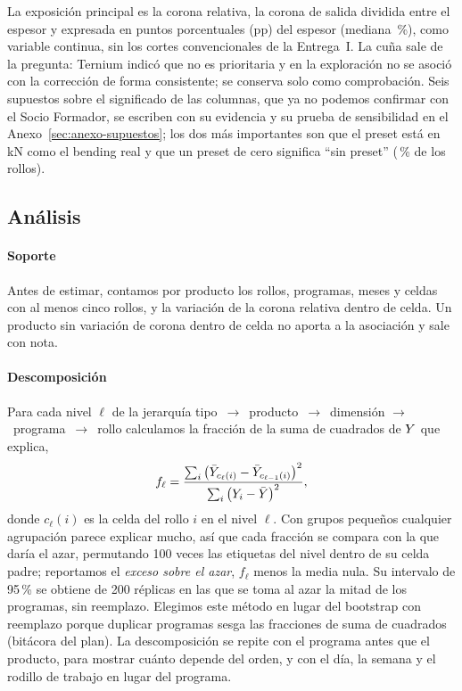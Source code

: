 La exposición principal es la corona relativa, la corona de salida dividida entre el espesor y expresada en puntos
porcentuales (pp) del espesor (mediana \CoronaRelMediana\,\%), como variable continua, sin los cortes convencionales
de la Entrega~I. La cuña sale de la pregunta: Ternium indicó que no es prioritaria y en la exploración no se asoció
con la corrección de forma consistente; se conserva solo como comprobación. Seis supuestos sobre el significado de las
columnas, que ya no podemos confirmar con el Socio Formador, se escriben con su evidencia y su prueba de sensibilidad
en el Anexo~\ref{sec:anexo-supuestos}; los dos más importantes son que el preset está en kN como el bending real y que
un preset de cero significa ``sin preset'' (\PctPresetCero\,\% de los rollos).

\subsection{Análisis}
\label{sec:analisis}

\paragraph{Soporte} Antes de estimar, contamos por producto los rollos, programas, meses y celdas con al menos cinco
rollos, y la variación de la corona relativa dentro de celda. Un producto sin variación de corona dentro de celda no
aporta a la asociación y sale con nota.

\paragraph{Descomposición} Para cada nivel $\ell$ de la jerarquía tipo~$\rightarrow$~producto~$\rightarrow$~dimensión
$\rightarrow$~programa~$\rightarrow$~rollo calculamos la fracción de la suma de cuadrados de $Y$ que explica,
\begin{equation}
f_\ell = \frac{\sum_i \left(\bar{Y}_{c_\ell(i)} - \bar{Y}_{c_{\ell-1}(i)}\right)^2}{\sum_i \left(Y_i - \bar{Y}\right)^2},
\label{eq:descomp}
\end{equation}
donde $c_\ell(i)$ es la celda del rollo $i$ en el nivel $\ell$. Con grupos pequeños cualquier agrupación parece explicar
mucho, así que cada fracción se compara con la que daría el azar, permutando 100 veces las etiquetas del nivel dentro de
su celda padre; reportamos el \emph{exceso sobre el azar}, $f_\ell$ menos la media nula. Su intervalo de 95\,\% se
obtiene de 200 réplicas en las que se toma al azar la mitad de los programas, sin reemplazo. Elegimos este método en
lugar del bootstrap con reemplazo porque duplicar programas sesga las fracciones de suma de cuadrados (bitácora del
plan). La descomposición se repite con el programa antes que el producto, para mostrar cuánto depende del orden, y
con el día, la semana y el rodillo de trabajo en lugar del programa.

